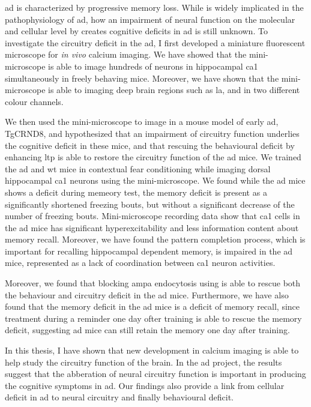 \Gls{ad} is characterized by progressive memory loss. While \abeta{} is widely implicated in the pathophysiology of \gls{ad}, how an impairment of neural function on the molecular and cellular level by \abeta{} creates cognitive deficits in \gls{ad} is still unknown. To investigate the circuitry deficit in the \gls{ad}, I first developed a miniature fluorescent microscope for \textit{in vivo} calcium imaging. We have showed that the mini-microscope is able to image hundreds of neurons in hippocampal \gls{ca1} simultaneously in freely behaving mice. Moreover, we have shown that the mini-microscope is able to imaging deep brain regions such as \gls{la}, and in two different colour channels. 

We then used the mini-microscope to image in a mouse model of early \gls{ad}, TgCRND8, and hypothesized that an impairment of circuitry function underlies the cognitive deficit in these mice, and that rescuing the behavioural deficit by enhancing \gls{ltp} is able to restore the circuitry function of the \gls{ad} mice. We trained the \gls{ad} and \gls{wt} mice in contextual fear conditioning while imaging dorsal hippocampal \gls{ca1} neurons using the mini-microscope. We found while the \gls{ad} mice shows a deficit during memeory test, the memory deficit is present as a significantly shortened freezing bouts, but without a significant decrease of the number of freezing bouts. Mini-microscope recording data show that \gls{ca1} cells in the \gls{ad} mice has significant hyperexcitability and less information content about memory recall. Moreover, we have found the pattern completion process, which is important for recalling hippocampal dependent memory, is impaired in the \gls{ad} mice, represented as a lack of coordination between \gls{ca1} neuron activities. 

Moreover, we found that blocking \gls{ampa} endocytosis using \tglu{} is able to rescue both the behaviour and circuitry deficit in the \gls{ad} mice. Furthermore, we have also found that the memory deficit in the \gls{ad} mice is a deficit of memory recall, since \tglu treatment during a reminder one day ofter training is able to rescue the memory deficit, suggesting \gls{ad} mice can still retain the memory one day after training. 

In this thesis, I have shown that new development in calcium imaging is able to help study the circuitry function of the brain. In the \gls{ad} project, the results suggest that the abberation of neural circuitry function is important in producing the cognitive symptoms in \gls{ad}. Our findings also provide a link from cellular deficit in \gls{ad} to neural circuitry and finally behavioural deficit. 


